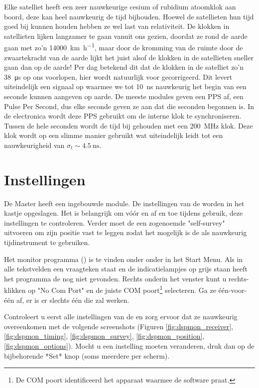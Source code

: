 Elke \gps satelliet heeft een zeer nauwkeurige cesium of rubidium
atoomklok aan boord, deze kan heel nauwkeurig de tijd bijhouden. Hoewel
de \gps satellieten hun tijd goed bij kunnen houden hebben ze wel last
van relativiteit. De klokken in \gps satellieten lijken langzamer te gaan
vanuit ons gezien, doordat ze rond de aarde gaan met zo'n
\SI{14000}{\kilo\meter\per\hour}, maar door de kromming van de ruimte
door de zwaartekracht van de aarde lijkt het juist alsof de klokken in de
\gps satellieten sneller gaan dan op de aarde! Per dag betekend dit dat
de klokken in de satelliet zo'n \SI{38}{\micro\second} op ons voorlopen,
hier wordt natuurlijk voor gecorrigeerd. Dit levert uiteindelijk een
signaal op waarmee we tot \SI{10}{\nano\second} nauwkeurig het begin van
een seconde kunnen aangeven op aarde. De meeste \gps modules geven een
PPS af, een Pulse Per Second, dus elke seconde geven ze aan dat die
seconden begonnen is. In de \hisparc electronica wordt deze PPS gebruikt
om de interne klok te synchroniseren. Tussen de hele seconden wordt de
tijd bij gehouden met een \SI{200}{\mega\hertz} klok. Deze klok wordt op
een slimme manier gebruikt wat uiteindelijk leidt tot een nauwkeurigheid
van $\sigma_t\sim\SI{4.5}{\nano\second}$.


\section{Instellingen}

De \hisparc Master heeft een ingebouwde \gps module. De instellingen van
de \gps worden in het kastje opgeslagen. Het is belangrijk om vóór en af
en toe tijdens gebruik, deze instellingen te controleren. Verder moet de
\gps een zogenoemde "self-survey" uitvoeren om zijn positie vast te
leggen zodat het mogelijk is de \gps als nauwkeurig tijdinstrument te
gebruiken.

Het \gps monitor programma (\dspmon) is te vinden onder onder \hisparc in
het Start Menu. Als in alle tekstvelden een vraagteken staat en de
indicatielampjes op grijs staan heeft het programma de \gps nog niet
gevonden. Rechts onderin het venster kunt u rechts-klikken op "No Com
Port" en de juiste COM poort\footnote{De COM poort identificeerd het
apparaat waarmee de software praat.} selecteren. Ga ze één-voor-één af,
er is er slechts één die zal werken.

Controleert u eerst alle instellingen van de \gps en zorg ervoor dat ze
nauwkeurig overeenkomen met de volgende screenshots (Figuren
\ref{fig:dspmon_receiver}, \ref{fig:dspmon_timing},
\ref{fig:dspmon_survey}, \ref{fig:dspmon_position},
\ref{fig:dspmon_options}). Mocht u een instelling moeten veranderen,
druk dan op de bijbehorende *Set* knop (soms meerdere per scherm).

